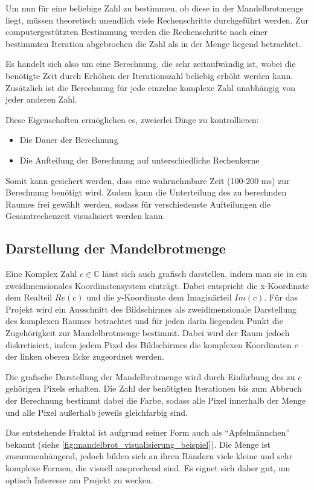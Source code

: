 Um nun für eine beliebige Zahl zu bestimmen, ob diese in der Mandelbrotmenge liegt, müssen
theoretisch unendlich viele Rechenschritte durchgeführt werden. Zur computergestützten Bestimmung
werden die Rechenschritte nach einer bestimmten Iteration abgebrochen die Zahl als in der Menge liegend betrachtet.

Es handelt sich also um eine Berechnung, die sehr zeitaufwändig ist, wobei
die benötigte Zeit durch Erhöhen der Iterationszahl beliebig erhöht werden kann.
Zusätzlich ist die Berechnung für jede einzelne komplexe Zahl unabhängig von
jeder anderen Zahl.

Diese Eigenschaften ermöglichen es, zweierlei Dinge zu kontrollieren:
\begin{itemize}
	\item Die Dauer der Berechnung
	\item Die Aufteilung der Berechnung auf unterschiedliche Rechenkerne
\end{itemize}

Somit kann gesichert werden, dass eine wahrnehmbare Zeit (100-200 ms) zur Berechnung benötigt wird.
Zudem kann die Unterteilung des zu berechnden Raumes frei gewählt werden, sodass
für verschiedenste Aufteilungen die Gesamtrechenzeit visualisiert werden kann.

\subsection{Darstellung der Mandelbrotmenge}

Eine Komplex Zahl \( c \in \mathbb{C} \) lässt sich auch grafisch darstellen, indem man sie in ein zweidimensionales Koordinatensystem einträgt.
Dabei entspricht die x-Koordinate dem Realteil \( Re(c) \) und die y-Koordinate dem Imaginärteil \( Im(c) \).
Für das Projekt wird ein Ausschnitt des Bildschirmes als zweidimensionale Darstellung des komplexen Raumes
betrachtet und für jeden darin liegenden Punkt die Zugehörigkeit zur Mandelbrotmenge bestimmt.
Dabei wird der Raum jedoch diskretisiert, indem jedem Pixel des Bildschirmes die komplexen Koordinaten $c$
der linken oberen Ecke zugeordnet werden.

Die grafische Darstellung der Mandelbrotmenge wird durch Einfärbung des zu $c$ gehörigen Pixels erhalten.
Die Zahl der benötigten Iterationen bis zum Abbruch der Berechnung bestimmt dabei die Farbe, sodass alle Pixel
innerhalb der Menge und alle Pixel außerhalb jeweils gleichfarbig sind.

Das entstehende Fraktal ist aufgrund seiner Form auch als “Apfelmännchen” bekannt (siehe \autoref{fig:mandelbrot_visualisierung_beispiel}).
Die Menge ist zusammenhängend, jedoch bilden sich an ihren Rändern viele kleine und sehr komplexe Formen, die visuell ansprechend sind. Es eignet sich daher gut, um optisch Interesse am Projekt zu wecken.

